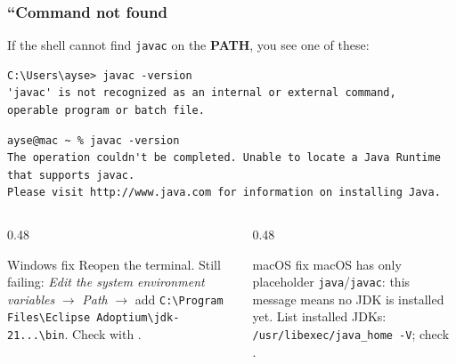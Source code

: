 \documentclass[aspectratio=169,10pt,compress]{beamer}
\newcommand{\cmd}[1]{\texttt{\color{gitred}#1}}
\begin{document}
\begin{frame}[t,fragile] \frametitle{``Command not found}
  \small If the shell cannot find \texttt{javac} on the \textbf{PATH}, you see one of these:


\begin{lstlisting}[style=codesnippet, language={}, basicstyle=\ttfamily\scriptsize]
C:\Users\ayse> javac -version
'javac' is not recognized as an internal or external command,
operable program or batch file.
\end{lstlisting}




\begin{lstlisting}[style=codesnippet, language={}, basicstyle=\ttfamily\scriptsize]
ayse@mac ~ % javac -version
The operation couldn't be completed. Unable to locate a Java Runtime that supports javac.
Please visit http://www.java.com for information on installing Java.
\end{lstlisting}



  \begin{columns}[T]
    \begin{column}{0.48\textwidth}
      \begin{block}{Windows fix}
        \footnotesize Reopen the terminal. Still failing: \emph{Edit the system environment variables} $\to$ \emph{Path} $\to$
        add \texttt{C:\textbackslash Program Files\textbackslash Eclipse Adoptium\textbackslash jdk-21...\textbackslash bin}. Check with .
      \end{block}
    \end{column}
    \begin{column}{0.48\textwidth}
      \begin{block}{macOS fix}
        \footnotesize macOS has only placeholder \texttt{java}/\texttt{javac}: this message means no JDK is installed yet.
        List installed JDKs: \cmd{/usr/libexec/java\_home -V}; check .
      \end{block}
    \end{column}
  \end{columns}
\end{frame}
\end{document}
